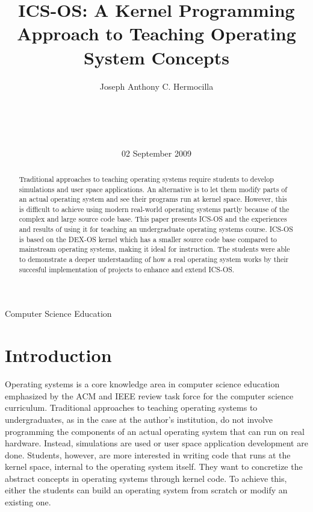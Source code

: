 \documentclass{acm_proc_article-sp}
\begin{document}
\title{ICS-OS: A Kernel Programming Approach to Teaching Operating System
Concepts}

\author{
\alignauthor
Joseph Anthony C. Hermocilla\\
       \\
       \\
       \\
       \\
}
\date{02 September 2009}

\maketitle
\begin{abstract}
Traditional approaches to teaching operating systems require students to
develop simulations and user space applications. An alternative
is to let them modify parts of an actual operating system and see their
programs run at kernel space. However, this is difficult to 
achieve using modern real-world operating systems partly because of the complex
and large source code base. This paper presents ICS-OS and the experiences and
results of using it for teaching an undergraduate operating systems course. 
ICS-OS is based on the DEX-OS kernel which has a smaller source code base
compared to mainstream operating systems, making it ideal for instruction. 
The students were able to demonstrate a deeper understanding
of how a real operating system works by their succesful implementation of
projects to enhance and extend ICS-OS.
\end{abstract}

{Computer Science Education}


\section{Introduction}
Operating systems is a core knowledge area in computer science education
emphasized by the ACM and IEEE review task force for the computer science 
curriculum. Traditional approaches to teaching operating systems to 
undergraduates, as in the case at the author's institution, do not involve 
programming the components of an actual operating system that can run on 
real hardware. Instead, simulations are used or user space application 
development are done. Students, however, are more interested in writing code
that runs at the kernel space, internal to the operating system itself. They
want to concretize the abstract concepts in operating systems through kernel
code. To achieve this, either the students can build an operating system from
scratch\cite{black:osfs} or modify an existing one.
\end{document}
